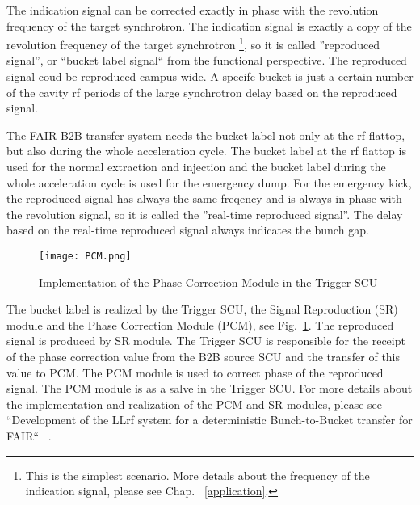 The indication signal can be corrected exactly in phase with the revolution frequency of the target synchrotron.  The indication signal is exactly a copy of the revolution frequency of the target synchrotron \footnote{This is the simplest scenario. More details about the frequency of the indication signal, please see Chap. ~\ref{application}.}, so it is called ''reproduced signal'', or ``bucket label signal`` from the functional perspective.  The reproduced signal coud be reproduced campus-wide. A specifc bucket is just a certain number of the cavity rf periods of the large synchrotron delay based on the reproduced signal.


The FAIR B2B transfer system needs the bucket label not only at the rf flattop, but also during the whole acceleration cycle. The bucket label at the rf flattop is used for the normal extraction and injection and the bucket label during the whole acceleration cycle is used for the emergency dump. For the emergency kick, the reproduced signal has always the same freqency and is always in phase with the revolution signal, so it is called the ''real-time reproduced signal''. The delay based on the real-time reproduced signal always indicates the bunch gap.


 \begin{figure}[!htb]
   \centering   
   \texttt{[image: PCM.png]}
   \caption{Implementation of the Phase Correction Module in the Trigger SCU}
   \label{PCM}
\end{figure}
The bucket label is realized by the Trigger SCU, the Signal Reproduction (SR) module and the Phase Correction Module (PCM), see Fig.~\ref{PCM}. The reproduced signal is produced by SR module. The Trigger SCU is responsible for the receipt of the phase correction value from the B2B source SCU and the transfer of this value to PCM. The PCM module is used to correct phase of the reproduced signal. The PCM module is as a salve in the Trigger SCU. For more details about the implementation and realization of the PCM and SR modules, please see ``Development of the LLrf system for a deterministic Bunch-to-Bucket transfer for FAIR`` ~\cite{ferrand_development_????}. 

